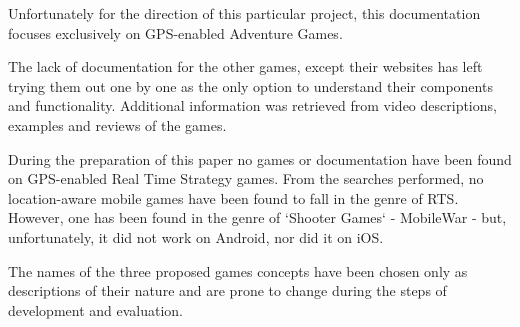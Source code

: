 Unfortunately for the direction of this particular
project, this documentation focuses exclusively on GPS-enabled Adventure Games.\newline

The lack of documentation for the other games, except their websites has left
trying them out one by one as the only option to understand their components and
functionality. Additional information was retrieved from video descriptions,
examples and reviews of the games.\newline

During the preparation of this paper no games or documentation have been found
on GPS-enabled Real Time Strategy games. From the searches performed, no
location-aware mobile games have been found to fall in the genre of RTS.
However, one has been found in the genre of `Shooter Games` - MobileWar
- but, unfortunately, it did not work on Android, nor did it on iOS.\newline

The names of the three proposed games concepts have been chosen only as
descriptions of their nature and are prone to change during the steps of
development and evaluation.

